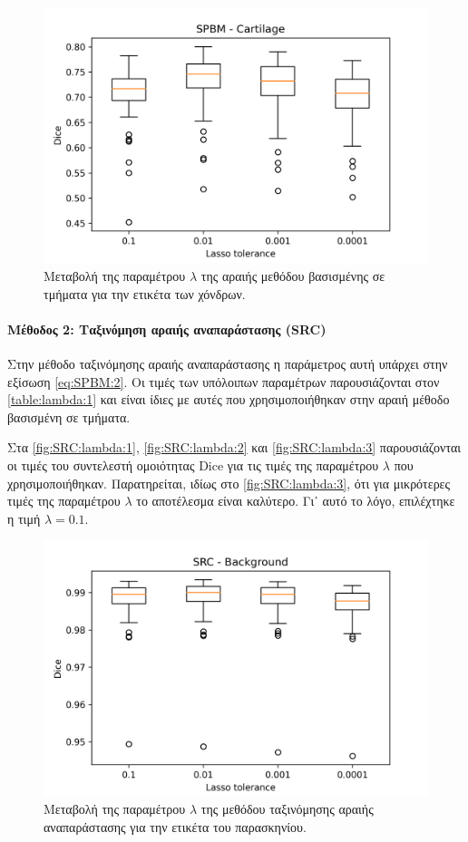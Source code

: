\documentclass[a4paper,12pt]{article}
\newcommand{\paragraphLine}[1]{\paragraph{#1}\mbox{}}
\begin{document}
\begin{figure}[H]
    \centering
    \includegraphics[width=0.85\linewidth]{SPBM_Lasso_tolerance_Cartilage_plot.png}
    \caption{Μεταβολή της παραμέτρου $\lambda$ της αραιής μεθόδου βασισμένης σε
             τμήματα για την ετικέτα των χόνδρων.}
    \label{fig:SPBM:lambda:3}
\end{figure}

\paragraphLine{Μέθοδος 2: Ταξινόμηση αραιής αναπαράστασης (SRC)}

Στην μέθοδο ταξινόμησης αραιής αναπαράστασης η παράμετρος αυτή υπάρχει στην
εξίσωση \eqref{eq:SPBM:2}. Οι τιμές των υπόλοιπων παραμέτρων παρουσιάζονται στον
\autoref{table:lambda:1} και είναι ίδιες με αυτές που χρησιμοποιήθηκαν στην
αραιή μέθοδο βασισμένη σε τμήματα.

Στα \autoref{fig:SRC:lambda:1}, \autoref{fig:SRC:lambda:2} και
\autoref{fig:SRC:lambda:3} παρουσιάζονται οι τιμές του συντελεστή ομοιότητας
Dice για τις τιμές της παραμέτρου $\lambda$ που χρησιμοποιήθηκαν. Παρατηρείται,
ιδίως στο \autoref{fig:SRC:lambda:3}, ότι για μικρότερες τιμές της παραμέτρου
$\lambda$ το αποτέλεσμα είναι καλύτερο. Γι᾽ αυτό το λόγο, επιλέχτηκε η τιμή
$\lambda = 0.1$.

\begin{figure}[H]
    \centering
    \includegraphics[width=0.85\linewidth]{SRC_Lasso_tolerance_Background_plot.png}
    \caption{Μεταβολή της παραμέτρου $\lambda$ της μεθόδου ταξινόμησης αραιής
             αναπαράστασης για την ετικέτα του παρασκηνίου.}
    \label{fig:SRC:lambda:1}
\end{figure}
\end{document}
